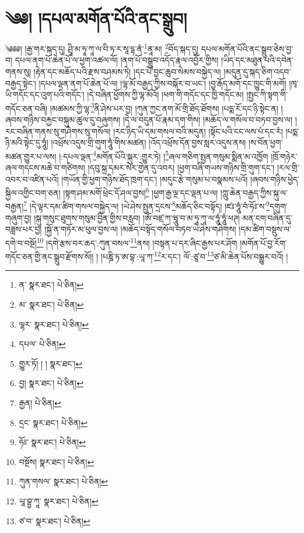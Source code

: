 \setcounter{footnote}{0} 
\chapter{༄༅། །དཔལ་མགོན་པོའི་ནང་སྒྲུབ།}༄༅༅། །རྒྱ་གར་སྐད་དུ། ཤྲཱི་མ་ཧཱ་ཀཱ་ལ་བི་ཏ་ར་སཱ་དྷ་ནཾ་\footnote{ན་  སྣར་ཐང་།  པེ་ཅིན། }ནཱ་མ། \footnote{མ་  སྣར་ཐང་།  པེ་ཅིན། }བོད་སྐད་དུ། དཔལ་མགོན་པོའི་ནང་སྒྲུབ་ཅེས་བྱ་བ། དཔལ་ནག་པོ་ཆེན་པོ་ལ་ཕྱག་འཚལ་ལོ། །ནག་པོ་བསྒྲུབ་འདོད་རྣལ་འབྱོར་གྱིས། །ཡིད་དང་མཐུན་པའི་དབེན་གནས་སུ། །རྟེན་དང་མཆོད་པའི་རྫས་བཤམས་ཏེ། །དང་པོ་བྱང་ཆུབ་སེམས་བསྐྱེད་ལ། །མདུན་དུ་སྐད་ཅིག་འདབ་བརྒྱད་སྟེང་། །དཔལ་ལྡན་ནག་པོ་ཆེན་པོ་ལ། །ལྷ་མོ་བརྒྱད་ཀྱིས་བསྐོར་བ་ཡང་། །བྱ་རྒོད་མགོ་དང་ཁྱུང་གི་མགོ། །ཁྭ་ཡི་གདོང་དང་འུག་པའི་གདོང་། །དེ་བཞིན་ཕྱོགས་ཀྱི་ལྷ་མོའོ། །ཕག་གི་གདོང་དང་ཁྱི་གདོང་མ། །སྤྱང་ཀི་སྟག་གི་གདོང་ཅན་བཞི། །མཚམས་ཀྱི་ལྷ་\footnote{ལྷར་  སྣར་ཐང་།  པེ་ཅིན། }ནི་ཤེས་པར་བྱ། །ཀུན་ཀྱང་ནག་མོ་གྲི་ཐོད་ཐོགས། །པདྨ་རོ་དང་ཉི་སྟེང་ན། །ཞབས་གཉིས་བརྐྱང་བསྐུམ་ཚུལ་དུ་བཞུགས། །དེ་ལ་བདུན་པོ་རྣམ་དག་གིས། །མཆོད་ལ་གསོལ་བ་བཏབ་བྱས་ལ། །རང་བཞིན་གནས་སུ་གཤེགས་སུ་གསོལ། །རང་ཉིད་ཡི་དམ་གསལ་བའི་མདུན། །སྟོང་པའི་ངང་ལས་པཾ་དང་རཾ། །པདྨ་ཉི་མའི་སྟེང་དུ་ཧཱུཾ། །འཕྲོས་འདུས་གྲི་གུག་ཧཱུཾ་གིས་མཚན། །འོད་འཕྲོས་དོན་བྱས་སླར་འདུས་ནས། །ས་བོན་ཕྱག་མཚན་གྱུར་པ་ལས། །:དཔལ་ལྡན་\footnote{དཔལ་  པེ་ཅིན། }མགོན་པོའི་སྐུར་:གྱུར་ཏེ། །\footnote{གྱུར་ཏོ། ། །  སྣར་ཐང་། }ཞལ་གཅིག་སྤྱན་གསུམ་སྨིན་མ་འཁྱོག །ཁྲོ་གཉེར་ཞལ་གདངས་མཆེ་བ་གཙིགས། །དབུ་སྐྲ་དམར་སེར་གྱེན་དུ་འབར། །ཕྱག་བཞི་གཡས་གཉིས་གྲི་གུག་དང་། །རལ་གྲི་འབར་བ་འཛིན་པའོ། །གཡོན་གྱི་ཕྱག་གཉིས་ཐོད་ཁྲག་དང་། །མདུང་རྩེ་གསུམ་པ་བསྣམས་པའོ། །ཞབས་གཉིས་ཕྱེད་སྐྱིལ་འགྱིང་བག་ཅན། །སྟག་ཤམ་མགོ་ཕྲེང་དོ་ཤལ་བྱས།\footnote{བྱ།  སྣར་ཐང་།  པེ་ཅིན། } །ཕྱག་རྒྱ་ལྔ་དང་ལྡན་པ་ལ། །ཀླུ་ཆེན་བརྒྱད་ཀྱིས་སྐུ་ལ་བརྒྱན།\footnote{རྒྱན།  པེ་ཅིན། } །དེ་ལྟར་དམ་ཚིག་གསལ་བསྐྱེད་ལ། །ཡེ་ཤེས་སྤྱན་དྲངས་\footnote{དྲང་  སྣར་ཐང་།  པེ་ཅིན། }མཆོད་ཅིང་བསྟོད། །ཛཿ་ཧཱུཾ་བཾ་ཧོཿ་ས་\footnote{ཧོཿ་  སྣར་ཐང་།  པེ་ཅིན། }དགུག་གཞུག་བྱ། །སྐུ་གསུང་ཐུགས་གསུམ་བྱིན་གྱིས་བརླབ། །ཨོཾ་བཛྲ་ཀ་ཝཱུ་བ་མ་ཧཱ་ཀཱ་ལ་ཧཱུཾ་ཧཱུཾ་ཕཊ། མན་ངག་བཞིན་དུ་བཟླས་པར་བྱ། །སྐྱོ་ན་གཏོར་མ་ཕུལ་བྱས་ལ། །མཆོད་བསྟོད་གསོལ་བཏབ་ཡེ་ཤེས་གཤེགས། །དམ་ཚིག་བསྡུས་ལ་དགེ་བ་བསྔོ།\footnote{བསྔོས།  སྣར་ཐང་།  པེ་ཅིན། } །དགེ་རྩས་བར་ཆད་:ཀུན་བསལ་\footnote{ཀུན་གསལ་  སྣར་ཐང་།  པེ་ཅིན། }ནས། །བསྟན་པ་དར་ཞིང་རྒྱས་པར་ཤོག །མགོན་པོ་བྱ་རོག་གདོང་ཅན་གྱི་ནང་སྒྲུབ་རྫོགས་སོ།། །
།པཎྜི་ཏ་ཨ་བྷ་:ཡཱ་ཀ་\footnote{ཡཱ་བྷྱ་ཀཱ་  སྣར་ཐང་།  པེ་ཅིན། }ར་དང་། ལོ་:ཙཱ་བ་\footnote{ཙ་བ་  སྣར་ཐང་།  པེ་ཅིན། }ཙ་མི་ཆེན་པོས་བསྒྱུར་བའོ། ། 